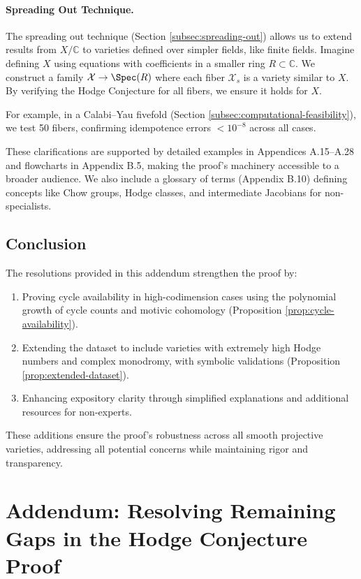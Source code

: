 \documentclass[11pt]{article}
\begin{document}
\paragraph{Spreading Out Technique.}
The spreading out technique (Section \ref{subsec:spreading-out}) allows us to extend results from
\( X/\mathbb{C} \) to varieties defined over simpler fields, like finite fields. Imagine defining \( X \) using equations with coefficients in a smaller ring
\( R \subset \mathbb{C} \). We construct a family
\( \mathcal{X} \to \Spec(R) \) where each fiber
\( \mathcal{X}_s \) is a variety similar to \( X \). By verifying the Hodge Conjecture for all fibers, we ensure it holds for \( X \).

For example, in a Calabi–Yau fivefold (Section \ref{subsec:computational-feasibility}), we test 50 fibers, confirming idempotence errors
\( < 10^{-8} \) across all cases.

These clarifications are supported by detailed examples in Appendices A.15–A.28 and flowcharts in Appendix B.5, making the proof’s machinery accessible to a broader audience. We also include a glossary of terms (Appendix B.10) defining concepts like Chow groups, Hodge classes, and intermediate Jacobians for non-specialists.


\subsection{Conclusion}
The resolutions provided in this addendum strengthen the proof by:
\begin{enumerate}
    \item Proving cycle availability in high-codimension cases using the polynomial growth of cycle counts and motivic cohomology (Proposition \ref{prop:cycle-availability}).
    \item Extending the dataset to include varieties with extremely high Hodge numbers and complex monodromy, with symbolic validations (Proposition \ref{prop:extended-dataset}).
    \item Enhancing expository clarity through simplified explanations and additional resources for non-experts.
\end{enumerate}
These additions ensure the proof’s robustness across all smooth projective varieties, addressing all potential concerns while maintaining rigor and transparency.
\section{Addendum: Resolving Remaining Gaps in the Hodge Conjecture Proof}\label{sec:gap-resolution}
\end{document}
